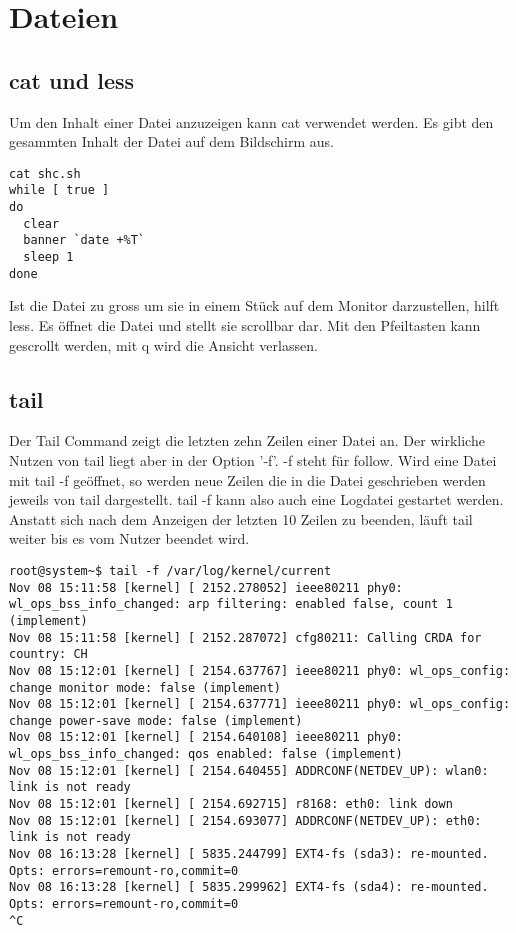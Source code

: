 \section{Dateien}
\subsection{cat und less}
Um den Inhalt einer Datei anzuzeigen kann cat verwendet werden. Es gibt den gesammten Inhalt der Datei auf dem Bildschirm aus.
\begin{lstlisting}
cat shc.sh
while [ true ]
do
  clear
  banner `date +%T`
  sleep 1
done
\end{lstlisting}
Ist die Datei zu gross um sie in einem St\"uck auf dem Monitor darzustellen, hilft less. Es \"offnet die Datei und stellt sie scrollbar dar. Mit den Pfeiltasten kann gescrollt werden, mit q wird die Ansicht verlassen.
\subsection{tail}
Der Tail Command zeigt die letzten zehn Zeilen einer Datei an. Der wirkliche Nutzen von tail liegt aber in der Option '-f'. -f steht f\"ur follow. Wird eine Datei mit tail -f ge\"offnet, so werden neue Zeilen die in die Datei geschrieben werden jeweils von tail dargestellt. tail -f kann also auch eine Logdatei gestartet werden. Anstatt sich nach dem Anzeigen der letzten 10 Zeilen zu beenden, l\"auft tail weiter bis es vom Nutzer beendet wird.
\begin{lstlisting}
root@system~$ tail -f /var/log/kernel/current
Nov 08 15:11:58 [kernel] [ 2152.278052] ieee80211 phy0: wl_ops_bss_info_changed: arp filtering: enabled false, count 1 (implement)
Nov 08 15:11:58 [kernel] [ 2152.287072] cfg80211: Calling CRDA for country: CH
Nov 08 15:12:01 [kernel] [ 2154.637767] ieee80211 phy0: wl_ops_config: change monitor mode: false (implement)
Nov 08 15:12:01 [kernel] [ 2154.637771] ieee80211 phy0: wl_ops_config: change power-save mode: false (implement)
Nov 08 15:12:01 [kernel] [ 2154.640108] ieee80211 phy0: wl_ops_bss_info_changed: qos enabled: false (implement)
Nov 08 15:12:01 [kernel] [ 2154.640455] ADDRCONF(NETDEV_UP): wlan0: link is not ready
Nov 08 15:12:01 [kernel] [ 2154.692715] r8168: eth0: link down
Nov 08 15:12:01 [kernel] [ 2154.693077] ADDRCONF(NETDEV_UP): eth0: link is not ready
Nov 08 16:13:28 [kernel] [ 5835.244799] EXT4-fs (sda3): re-mounted. Opts: errors=remount-ro,commit=0
Nov 08 16:13:28 [kernel] [ 5835.299962] EXT4-fs (sda4): re-mounted. Opts: errors=remount-ro,commit=0
^C
\end{lstlisting}
